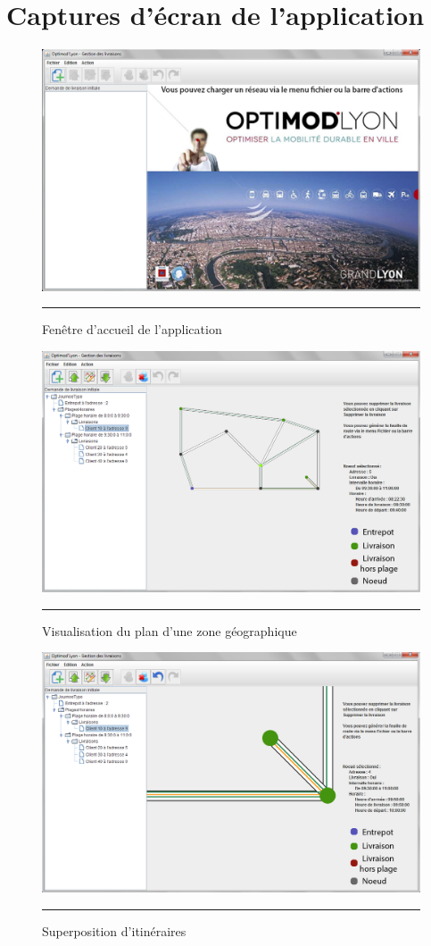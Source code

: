 
\section{Captures d'écran de l'application}
\begin{figure}[H]
	\centering
		\includegraphics{Figures/welcome}
		\rule{35em}{0.5pt}
	\caption[Fenêtre d'accueil de l'application]{Fenêtre d'accueil de l'application}
\end{figure}
\begin{figure}[H]
	\centering
		\includegraphics{Figures/plan}
		\rule{35em}{0.5pt}
	\caption[Visualisation du plan d'une zone géographique]{Visualisation du plan d'une zone géographique}
\end{figure}
\begin{figure}[H]
	\centering
		\includegraphics{Figures/path}
		\rule{35em}{0.5pt}
	\caption[Superposition d'itinéraires]{Superposition d'itinéraires}
\end{figure}
